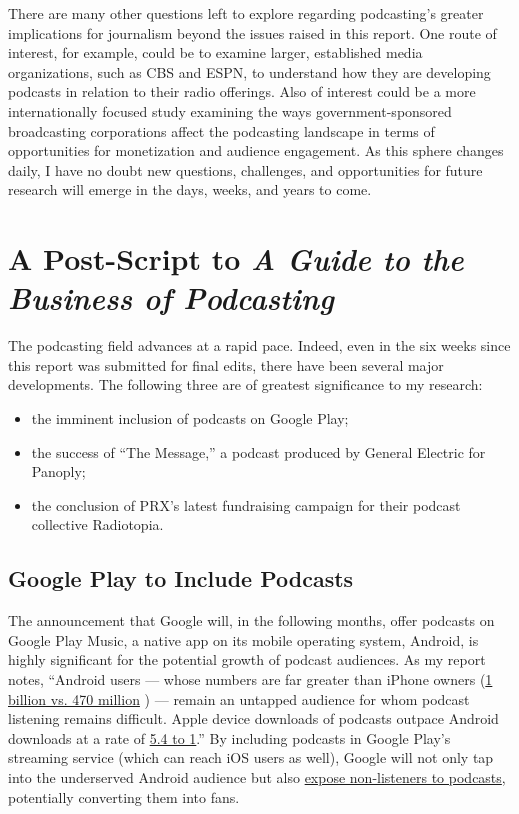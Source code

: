 \documentclass[notoc, symmetric, nobib, nols]{towcenter-guideto-book}
\begin{document}
There are many other questions left to explore regarding podcasting's greater implications for journalism beyond the issues raised in this report. One route of interest, for example, could be to examine larger, established media organizations, such as CBS and ESPN, to understand how they are developing podcasts in relation to their radio offerings. Also of interest could be a more internationally focused study examining the ways government-sponsored broadcasting corporations affect the podcasting landscape in terms of opportunities for monetization and audience engagement. As this sphere changes daily, I have no doubt new questions, challenges, and opportunities for future research will emerge in the days, weeks, and years to come. 

\chapter{A Post-Script to \textit{A Guide to the Business of Podcasting}}

The podcasting field advances at a rapid pace. Indeed, even in the six weeks since this report was submitted for final edits, there have been several major developments. The following three are of greatest significance to my research:

\begin{itemize}
\item the imminent inclusion of podcasts on Google Play;
\item the success of ``The Message,'' a podcast produced by General Electric for Panoply;
\item the conclusion of PRX's latest fundraising campaign for their podcast collective Radiotopia.
\end{itemize}

\section{Google Play to Include Podcasts}
The announcement that Google will, in the following months, offer podcasts on Google Play Music, a native app on its mobile operating system, Android, is highly significant for the potential growth of podcast audiences. As my report notes, ``Android users — whose numbers are far greater than iPhone owners (\href{http://www.slate.com/blogs/future_tense/2014/06/26/there_are_twice_as_many_android_users_as_ios_but_ios_users_spend_double.html}{1 billion vs. 470 million} \autocite{smartphones}) — remain an untapped audience for whom podcast listening remains difficult. Apple device downloads of podcasts outpace Android downloads at a rate of \href{http://www.libsyn.com/wp-content/uploads/2015/06/PRLibsynNetGrowth021915Final.pdf}{5.4 to 1}.''\autocite{libsyndata} By including podcasts in Google Play's streaming service (which can reach iOS users as well), Google will not only tap into the underserved Android audience but also \href{http://recode.net/2015/10/27/google-brings-podcasting-to-play-music-swinging-at-apples-dominance/}{expose non-listeners to podcasts}, potentially converting them into fans.\autocite{recodegplay}
\end{document}
